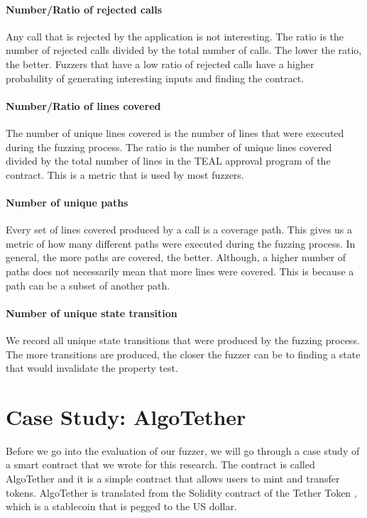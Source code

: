 \paragraph{Number/Ratio of rejected calls} Any call that is rejected by the application is not interesting.
The ratio is the number of rejected calls divided by the total number of calls.
The lower the ratio, the better.
Fuzzers that have a low ratio of rejected calls have a higher probability of generating interesting inputs and finding the contract.

\paragraph{Number/Ratio of lines covered} The number of unique lines covered is the number of lines that were executed during the fuzzing process.
The ratio is the number of unique lines covered divided by the total number of lines in the \ac{TEAL} approval program of the contract.
This is a metric that is used by most fuzzers.

\paragraph{Number of unique paths} Every set of lines covered produced by a call is a coverage path.
This gives us a metric of how many different paths were executed during the fuzzing process.
In general, the more paths are covered, the better.
Although, a higher number of paths does not necessarily mean that more lines were covered.
This is because a path can be a subset of another path.

\paragraph{Number of unique state transition} We record all unique state transitions that were produced by the fuzzing process.
The more transitions are produced, the closer the fuzzer can be to finding a state that would invalidate the property test.

\section{Case Study: AlgoTether}
Before we go into the evaluation of our fuzzer, we will go through a case study of a smart contract that we wrote for this research.
The contract is called AlgoTether and it is a simple contract that allows users to mint and transfer tokens.
AlgoTether is translated from the Solidity contract of the Tether Token \cite{etherscanio_tether_nodate}, which is a stablecoin that is pegged to the US dollar.

